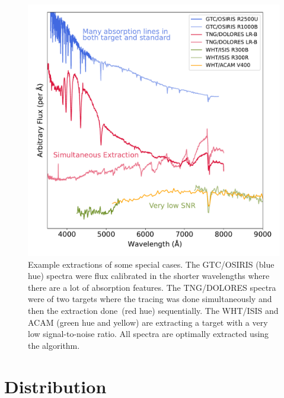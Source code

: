 \documentclass[linenumbers, twocolumn]{aastex631}
\begin{document}
\begin{figure}
    \centering
    \includegraphics[width=\textwidth]{fig_09_use_case_plots.pdf}
    \caption{Example extractions of some special cases. The GTC/OSIRIS (blue hue)
    spectra were flux calibrated in the shorter wavelengths where there are a lot
    of absorption features. The TNG/DOLORES spectra were of two targets where the
    tracing was done simultaneously and then the extraction done~(red hue)
    sequentially. The WHT/ISIS and ACAM (green hue and yellow) are extracting a
    target with a very low signal-to-noise ratio. All spectra are optimally extracted using the \citep{1986PASP...98..609H} algorithm.}
    \label{fig:use_cases}
\end{figure}

\section{Distribution}
\label{sec:distribution}
\end{document}
